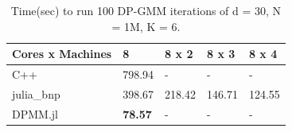 \documentclass[12pt, a4paper]{article}
\begin{document}

\begin{table}[h!]
\caption{Time (sec) to run 100 iterations for DP-GMM (d=2, N=1M, K=6) and  DP-MNMM (d=100, N=1M, K=6)}
\label{tab:splitmergecores}

\end{table}


\begin{table}[h!]
\centering
\begin{tabular}{@{}l|l|l|l|l|@{}}
\textbf{Cores x Machines}  & 8      & 8 x 2  & 8 x 3    & 8 x 4    \\ \hline
C++              & 798.94 & -      & -      & -      \\
julia\_bnp       & 398.67 & 218.42 & 146.71 & 124.55 \\
DPMM.jl          & \textbf{78.57} & -      & -      & -      \\
\end{tabular}%
\caption{Time(sec) to run 100 DP-GMM iterations of d = 30, N = 1M, K = 6.}
\label{tab:d30dplitmerge}
\end{table}
\end{document}
